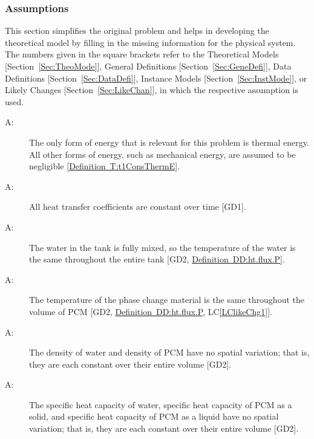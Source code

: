 \documentclass[12pt]{article}
\newcounter{assumpnum}
\newcommand{\atheassumpnum}{A\theassumpnum}
\begin{document}
\subsubsection{Assumptions}
\label{Sec:Assu}
This section simplifies the original problem and helps in developing the theoretical model by filling in the missing information for the physical system. The numbers given in the square brackets refer to the Theoretical Models [Section~\ref{Sec:TheoMode}], General Definitions [Section~\ref{Sec:GeneDefi}], Data Definitions [Section~\ref{Sec:DataDefi}], Instance Models [Section~\ref{Sec:InstMode}], or Likely Changes [Section~\ref{Sec:LikeChan}], in which the respective assumption is used.
\begin{description}
\item[\atheassumpnum\label{Aassump1}:]The only form of energy that is relevant for this problem is thermal energy. All other forms of energy, such as mechanical energy, are assumed to be negligible [\hyperref[T:t1ConsThermE]{Definition~T:t1ConsThermE}].
\end{description}
\begin{description}
\item[\atheassumpnum\label{Aassump2}:]All heat transfer coefficients are constant over time [GD1].
\end{description}
\begin{description}
\item[\atheassumpnum\label{Aassump3}:]The water in the tank is fully mixed, so the temperature of the water is the same throughout the entire tank [GD2, \hyperref[DD:ht.flux.P]{Definition~DD:ht.flux.P}].
\end{description}
\begin{description}
\item[\atheassumpnum\label{Aassump4}:]The temperature of the phase change material is the same throughout the volume of PCM [GD2, \hyperref[DD:ht.flux.P]{Definition~DD:ht.flux.P}, LC\ref{LClikeChg1}].
\end{description}
\begin{description}
\item[\atheassumpnum\label{Aassump5}:]The density of water and density of PCM have no spatial variation; that is, they are each constant over their entire volume [GD2].
\end{description}
\begin{description}
\item[\atheassumpnum\label{Aassump6}:]The specific heat capacity of water, specific heat capacity of PCM as a solid, and specific heat capacity of PCM as a liquid have no spatial variation; that is, they are each constant over their entire volume [GD2].
\end{description}
\end{document}
